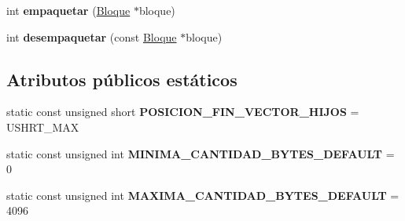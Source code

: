 \begin{DoxyCompactItemize}
\item 
\hypertarget{class_nodo_interno_a2bd521275fcc33edc81be99af612a740}{int {\bfseries empaquetar} (\hyperlink{class_bloque}{\-Bloque} $\ast$bloque)}\label{class_nodo_interno_a2bd521275fcc33edc81be99af612a740}

\item 
\hypertarget{class_nodo_interno_a3317d6050526a85af08c546356d5b53e}{int {\bfseries desempaquetar} (const \hyperlink{class_bloque}{\-Bloque} $\ast$bloque)}\label{class_nodo_interno_a3317d6050526a85af08c546356d5b53e}

\end{DoxyCompactItemize}
\subsection*{\-Atributos públicos estáticos}
\begin{DoxyCompactItemize}
\item 
\hypertarget{class_nodo_interno_a4060903d9e1836f56ca63ca27b18bc11}{static const unsigned short {\bfseries \-P\-O\-S\-I\-C\-I\-O\-N\-\_\-\-F\-I\-N\-\_\-\-V\-E\-C\-T\-O\-R\-\_\-\-H\-I\-J\-O\-S} = \-U\-S\-H\-R\-T\-\_\-\-M\-A\-X}\label{class_nodo_interno_a4060903d9e1836f56ca63ca27b18bc11}

\item 
\hypertarget{class_nodo_interno_a944b7a5c9c93c3a542e5c518db98355e}{static const unsigned int {\bfseries \-M\-I\-N\-I\-M\-A\-\_\-\-C\-A\-N\-T\-I\-D\-A\-D\-\_\-\-B\-Y\-T\-E\-S\-\_\-\-D\-E\-F\-A\-U\-L\-T} = 0}\label{class_nodo_interno_a944b7a5c9c93c3a542e5c518db98355e}

\item 
\hypertarget{class_nodo_interno_a9004c5fff0fc00b6c3db5b212d6c19f8}{static const unsigned int {\bfseries \-M\-A\-X\-I\-M\-A\-\_\-\-C\-A\-N\-T\-I\-D\-A\-D\-\_\-\-B\-Y\-T\-E\-S\-\_\-\-D\-E\-F\-A\-U\-L\-T} = 4096}\label{class_nodo_interno_a9004c5fff0fc00b6c3db5b212d6c19f8}

\end{DoxyCompactItemize}
